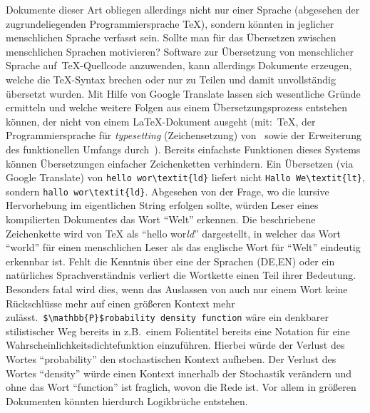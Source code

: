 Dokumente dieser Art obliegen allerdings nicht nur einer Sprache (abgesehen der zugrundeliegenden Programmiersprache \TeX{}), sondern könnten in jeglicher menschlichen Sprache verfasst sein. Sollte man für das Übersetzen zwischen menschlichen Sprachen motivieren?%
Software zur Übersetzung von menschlicher Sprache auf~\nocite{texbook}\TeX{}-Quellcode anzuwenden, kann allerdings Dokumente erzeugen, welche die \TeX{}-Syntax brechen oder nur zu Teilen und damit unvollständig übersetzt wurden. Mit Hilfe von Google Translate lassen sich wesentliche Gründe ermitteln und welche weitere Folgen aus einem Übersetzungsprozess entstehen können, der nicht von einem \LaTeX{}-Dokument ausgeht (mit:\ \TeX{}, der Programmiersprache für \textit{typesetting} (Zeichensetzung) von~\cite{texbook} sowie der Erweiterung des funktionellen Umfangs durch~\cite{latexCompanion:leslieLamport}).%
Bereits einfachste Funktionen dieses Systems können Übersetzungen einfacher Zeichenketten verhindern. Ein Übersetzen (via Google Translate) von \verb|hello wor\textit{ld}| liefert nicht \verb|Hallo We\textit{lt}|, sondern \verb|hallo wor\textit{ld}|. Abgesehen von der Frage, wo die kursive Hervorhebung im eigentlichen String erfolgen sollte, würden Leser eines kompilierten Dokumentes das Wort \enquote{Welt} erkennen.%
Die beschriebene Zeichenkette wird von \TeX{} als \enquote{hello wor\textit{ld}} dargestellt, in welcher das Wort \enquote{world} für einen menschlichen Leser als das englische Wort für \enquote{Welt} eindeutig erkennbar ist. Fehlt die Kenntnis über eine der Sprachen (DE,EN) oder ein natürliches Sprachverständnis verliert die Wortkette einen Teil ihrer Bedeutung.%
Besonders fatal wird dies, wenn das Auslassen von auch nur einem Wort keine Rückschlüsse mehr auf einen größeren Kontext mehr zulässt.\ \verb|$\mathbb{P}$robability density function| wäre ein denkbarer stilistischer Weg bereits in z.B.\ einem Folientitel bereits eine Notation für eine Wahrscheinlichkeitsdichtefunktion einzuführen. Hierbei würde der Verlust des Wortes \enquote{probability} den stochastischen Kontext aufheben. Der Verlust des Wortes \enquote{density} würde einen Kontext innerhalb der Stochastik verändern und ohne das Wort \enquote{function} ist fraglich, wovon die Rede ist. Vor allem in größeren Dokumenten könnten hierdurch Logikbrüche entstehen.%
\\\noindent

